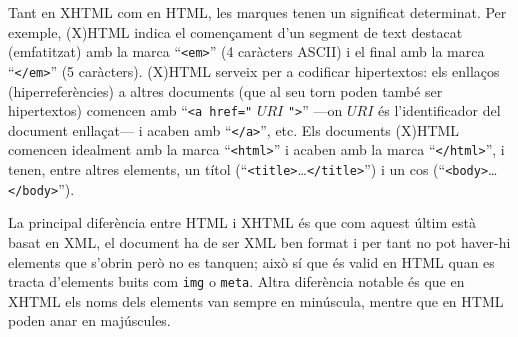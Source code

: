 Tant en XHTML com en HTML, les marques tenen un significat determinat.
Per exemple, (X)HTML indica el començament d'un segment de text
destacat (emfatitzat) amb la marca ``{\tt <em>}'' (4 caràcters ASCII)
i el final amb la marca ``{\tt </em>}'' (5 caràcters). (X)HTML serveix
per a codificar hipertextos: els enllaços (hiperreferències) a altres
documents (que al seu torn poden també ser hipertextos) comencen amb
``\texttt{<a href="} $\mathit{URI}$ \texttt{"}\texttt{>}'' ---on
$\mathit{URI}$ és l'identificador del document enllaçat--- i acaben
amb ``\texttt{</a>}'', etc. Els documents (X)HTML comencen idealment
amb la marca ``\texttt{<html>}'' i acaben amb la marca
``\texttt{</html>}'', i tenen, entre altres elements, un títol
(``\texttt{<title>}\ldots\texttt{</title>}'') i un cos
(``\texttt{<body>}\ldots\texttt{</body>}'').  

La principal diferència entre HTML i XHTML és que com aquest últim
està basat en XML, el document ha de ser XML ben format i per tant no
pot haver-hi elements que s'obrin però no es tanquen; això sí que és valid
en HTML quan es tracta d'elements buits com \texttt{img} o
\texttt{meta}. Altra diferència notable és que en XHTML els noms dels
elements van sempre en minúscula, mentre que en HTML poden anar en
majúscules.

